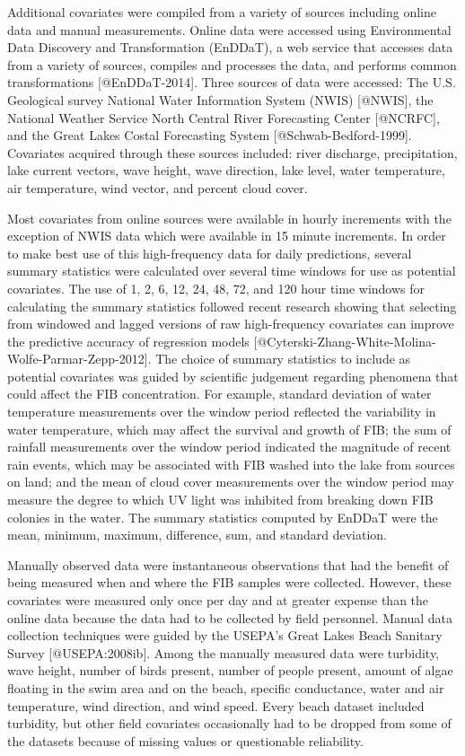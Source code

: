 Additional covariates were compiled from a variety of sources including
online data and manual measurements. Online data were accessed using
Environmental Data Discovery and Transformation (EnDDaT), a web service
that accesses data from a variety of sources, compiles and processes the
data, and performs common transformations {[}@EnDDaT-2014{]}. Three
sources of data were accessed: The U.S. Geological survey National Water
Information System (NWIS) {[}@NWIS{]}, the National Weather Service
North Central River Forecasting Center {[}@NCRFC{]}, and the Great Lakes
Costal Forecasting System {[}@Schwab-Bedford-1999{]}. Covariates
acquired through these sources included: river discharge, precipitation,
lake current vectors, wave height, wave direction, lake level, water
temperature, air temperature, wind vector, and percent cloud cover.

Most covariates from online sources were available in hourly increments
with the exception of NWIS data which were available in 15 minute
increments. In order to make best use of this high-frequency data for
daily predictions, several summary statistics were calculated over
several time windows for use as potential covariates. The use of 1, 2,
6, 12, 24, 48, 72, and 120 hour time windows for calculating the summary
statistics followed recent research showing that selecting from windowed
and lagged versions of raw high-frequency covariates can improve the
predictive accuracy of regression models
{[}@Cyterski-Zhang-White-Molina-Wolfe-Parmar-Zepp-2012{]}. The choice of
summary statistics to include as potential covariates was guided by
scientific judgement regarding phenomena that could affect the FIB
concentration. For example, standard deviation of water temperature
measurements over the window period reflected the variability in water
temperature, which may affect the survival and growth of FIB; the sum of
rainfall measurements over the window period indicated the magnitude of
recent rain events, which may be associated with FIB washed into the
lake from sources on land; and the mean of cloud cover measurements over
the window period may measure the degree to which UV light was inhibited
from breaking down FIB colonies in the water. The summary statistics
computed by EnDDaT were the mean, minimum, maximum, difference, sum, and
standard deviation.

Manually observed data were instantaneous observations that had the
benefit of being measured when and where the FIB samples were collected.
However, these covariates were measured only once per day and at greater
expense than the online data because the data had to be collected by
field personnel. Manual data collection techniques were guided by the
USEPA's Great Lakes Beach Sanitary Survey {[}@USEPA:2008ib{]}. Among the
manually measured data were turbidity, wave height, number of birds
present, number of people present, amount of algae floating in the swim
area and on the beach, specific conductance, water and air temperature,
wind direction, and wind speed. Every beach dataset included turbidity,
but other field covariates occasionally had to be dropped from some of
the datasets because of missing values or questionable reliability.

